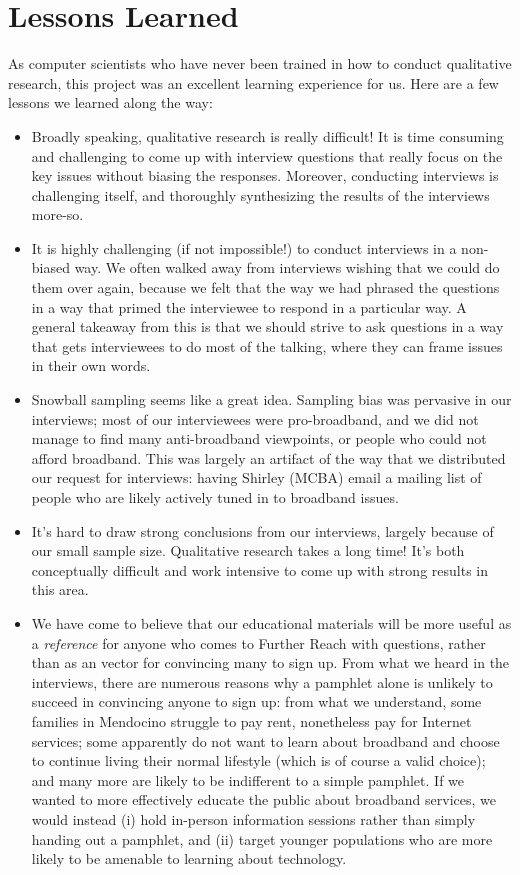 \section{Lessons Learned}
\label{sec:lessons}

As computer scientists who have never been trained in how to conduct qualitative
research, this project was an excellent learning
experience for us. Here are a few lessons we learned along the way:

\begin{itemize}
\item Broadly speaking, qualitative research is really difficult! It is time
consuming and challenging to come up with interview questions that really
focus on the key issues without biasing the responses. Moreover, conducting
interviews is challenging itself, and thoroughly synthesizing the results of
the interviews more-so.
\item It is highly challenging (if not impossible!) to conduct interviews in a
non-biased way. We often walked away from interviews wishing that we could do
them over again, because we felt that the way we had phrased the questions in
a way that primed the interviewee to respond in a particular way. A general
takeaway from this is that we should strive to ask questions in a way that
gets interviewees to do most of the talking, where they can frame issues in
their own words.
\item Snowball sampling seems like a great idea. Sampling bias was pervasive in our interviews; most of our
interviewees were pro-broadband, and we did not manage to find many
anti-broadband viewpoints,
or people who could not afford broadband. This was largely an artifact of the
way that we distributed our request for interviews: having Shirley (MCBA)
email a mailing list of people who are likely actively tuned in to broadband issues.
\item It's hard to draw strong conclusions from our interviews, largely
because of our small sample size. Qualitative research takes a long time! It's
both conceptually difficult and work intensive to come up with strong results
in this area.
\item We have come to believe that our educational materials will be more
useful as a {\em reference} for anyone who comes to Further Reach with
questions, rather than as an vector for convincing many to sign up. From
what we heard in the interviews, there
are numerous reasons why a pamphlet alone is unlikely to succeed in convincing
anyone to sign up: from what we understand, some families in Mendocino
struggle to pay rent, nonetheless
pay for Internet services; some apparently do not want to learn about broadband
and choose to continue living their normal lifestyle (which is of course a
valid choice);
and many more are likely to be indifferent to a simple pamphlet. If we wanted to more effectively
educate the public about broadband services, we would instead (i) hold
in-person information sessions rather than simply handing out a pamphlet, and
(ii) target younger populations who are more likely to be amenable to learning
about technology.
\end{itemize}

